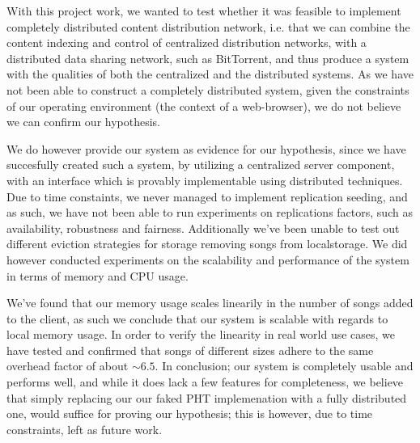 With this project work, we wanted to test whether it was feasible to implement
completely distributed content distribution network, i.e. that we can combine
the content indexing and control of centralized distribution networks, with a
distributed data sharing network, such as BitTorrent, and thus produce a system
with the qualities of both the centralized and the distributed systems.
\newline\newline
As we have not been able to construct a completely distributed system, given
the constraints of our operating environment (the context of a web-browser), we
do not believe we can confirm our hypothesis.

We do however provide our system as evidence for our hypothesis, since we have
succesfully created such a system, by utilizing a centralized server component,
with an interface which is provably implementable using distributed techniques.
\newline\newline
Due to time constaints, we never managed to implement replication seeding, and
as such, we have not been able to run experiments on replications factors, such
as availability, robustness and fairness. Additionally we've been unable to
test out different eviction strategies for storage removing songs from
localstorage.
\newline\newline
We did however conducted experiments on the scalability and performance of the 
system in terms of memory and CPU usage.

We've found that our memory usage scales linearily in the number of songs added
to the client, as such we conclude that our system is scalable with regards to
local memory usage. In order to verify the linearity in real world use cases,
we have tested and confirmed that songs of different sizes adhere to the same
overhead factor of about $\sim6.5$.
\newline\newline
In conclusion; our system is completely usable and performs well, and while it 
does lack a few features for completeness, we believe that simply replacing our
our faked \acs{PHT} implemenation with a fully distributed one, would suffice 
for proving our hypothesis; this is however, due to time constraints, left as 
future work.
